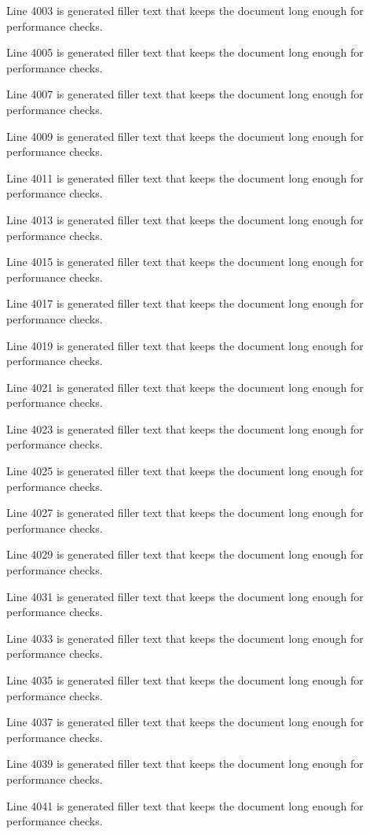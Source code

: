 Line 4003 is generated filler text that keeps the document long enough for performance checks.

Line 4005 is generated filler text that keeps the document long enough for performance checks.

Line 4007 is generated filler text that keeps the document long enough for performance checks.

Line 4009 is generated filler text that keeps the document long enough for performance checks.

Line 4011 is generated filler text that keeps the document long enough for performance checks.

Line 4013 is generated filler text that keeps the document long enough for performance checks.

Line 4015 is generated filler text that keeps the document long enough for performance checks.

Line 4017 is generated filler text that keeps the document long enough for performance checks.

Line 4019 is generated filler text that keeps the document long enough for performance checks.

Line 4021 is generated filler text that keeps the document long enough for performance checks.

Line 4023 is generated filler text that keeps the document long enough for performance checks.

Line 4025 is generated filler text that keeps the document long enough for performance checks.

Line 4027 is generated filler text that keeps the document long enough for performance checks.

Line 4029 is generated filler text that keeps the document long enough for performance checks.

Line 4031 is generated filler text that keeps the document long enough for performance checks.

Line 4033 is generated filler text that keeps the document long enough for performance checks.

Line 4035 is generated filler text that keeps the document long enough for performance checks.

Line 4037 is generated filler text that keeps the document long enough for performance checks.

Line 4039 is generated filler text that keeps the document long enough for performance checks.

Line 4041 is generated filler text that keeps the document long enough for performance checks.

